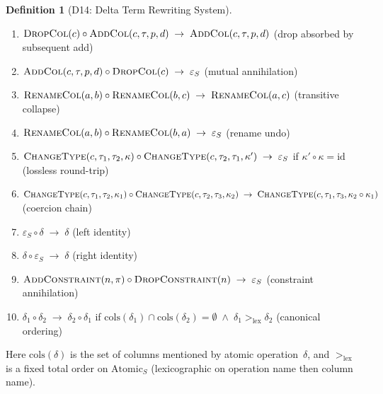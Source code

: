 \documentclass[11pt,a4paper]{article}
\theoremstyle{definition}
\newtheorem{definition}[theorem]{Definition}
\newcommand{\epsS}{\varepsilon_S}
\begin{document}
\begin{definition}[D14: Delta Term Rewriting System]
\begin{enumerate}[nosep,label=(R\arabic*)]
  \item \label{rule:drop-add}
    $\textsc{DropCol}(c) \circ \textsc{AddCol}(c, \tau, p, d)
    \;\to\; \textsc{AddCol}(c, \tau, p, d)$
    \hfill (drop absorbed by subsequent add)
  \item \label{rule:add-drop}
    $\textsc{AddCol}(c, \tau, p, d) \circ \textsc{DropCol}(c) \;\to\; \epsS$
    \hfill (mutual annihilation)
  \item \label{rule:rename-chain}
    $\textsc{RenameCol}(a, b) \circ \textsc{RenameCol}(b, c)
    \;\to\; \textsc{RenameCol}(a, c)$
    \hfill (transitive collapse)
  \item \label{rule:rename-inverse}
    $\textsc{RenameCol}(a, b) \circ \textsc{RenameCol}(b, a) \;\to\; \epsS$
    \hfill (rename undo)
  \item \label{rule:type-roundtrip}
    $\textsc{ChangeType}(c, \tau_1, \tau_2, \kappa) \circ
    \textsc{ChangeType}(c, \tau_2, \tau_1, \kappa')
    \;\to\; \epsS$
    \quad if $\kappa' \circ \kappa = \mathrm{id}$
    \hfill (lossless round-trip)
  \item \label{rule:type-chain}
    $\textsc{ChangeType}(c, \tau_1, \tau_2, \kappa_1) \circ
    \textsc{ChangeType}(c, \tau_2, \tau_3, \kappa_2)
    \;\to\; \textsc{ChangeType}(c, \tau_1, \tau_3, \kappa_2 \circ \kappa_1)$
    \hfill (coercion chain)
  \item \label{rule:identity-left}
    $\epsS \circ \delta \;\to\; \delta$
    \hfill (left identity)
  \item \label{rule:identity-right}
    $\delta \circ \epsS \;\to\; \delta$
    \hfill (right identity)
  \item \label{rule:constraint-cancel}
    $\textsc{AddConstraint}(n, \pi) \circ \textsc{DropConstraint}(n)
    \;\to\; \epsS$
    \hfill (constraint annihilation)
  \item \label{rule:independent-sort}
    $\delta_1 \circ \delta_2 \;\to\; \delta_2 \circ \delta_1$
    \quad if $\mathrm{cols}(\delta_1) \cap \mathrm{cols}(\delta_2) = \emptyset
    \;\wedge\; \delta_1 >_{\mathrm{lex}} \delta_2$
    \hfill (canonical ordering)
\end{enumerate}
Here $\mathrm{cols}(\delta)$ is the set of columns mentioned by atomic
operation~$\delta$, and $>_{\mathrm{lex}}$ is a fixed total order on
$\mathrm{Atomic}_S$ (lexicographic on operation name then column name).
\end{definition}
\end{document}
